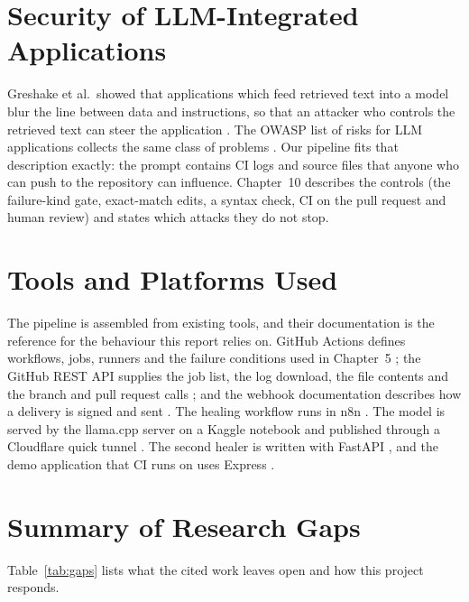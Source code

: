 \section{Security of LLM-Integrated Applications}
Greshake et al.\ showed that applications which feed retrieved text into a model blur the line between data and instructions, so that an attacker who controls the retrieved text can steer the application \cite{greshake23}. The OWASP list of risks for LLM applications collects the same class of problems \cite{owasp-llm}. Our pipeline fits that description exactly: the prompt contains CI logs and source files that anyone who can push to the repository can influence. Chapter~10 describes the controls (the failure-kind gate, exact-match edits, a syntax check, CI on the pull request and human review) and states which attacks they do not stop.

\section{Tools and Platforms Used}
The pipeline is assembled from existing tools, and their documentation is the reference for the behaviour this report relies on. GitHub Actions defines workflows, jobs, runners and the failure conditions used in Chapter~5 \cite{gh-actions}; the GitHub REST API supplies the job list, the log download, the file contents and the branch and pull request calls \cite{gh-rest}; and the webhook documentation describes how a delivery is signed and sent \cite{gh-webhooks}. The healing workflow runs in n8n \cite{n8n-docs}. The model is served by the llama.cpp server \cite{llamacpp} on a Kaggle notebook \cite{kaggle-docs} and published through a Cloudflare quick tunnel \cite{cf-tunnel}. The second healer is written with FastAPI \cite{fastapi}, and the demo application that CI runs on uses Express \cite{express}.

\section{Summary of Research Gaps}
Table~\ref{tab:gaps} lists what the cited work leaves open and how this project responds.

